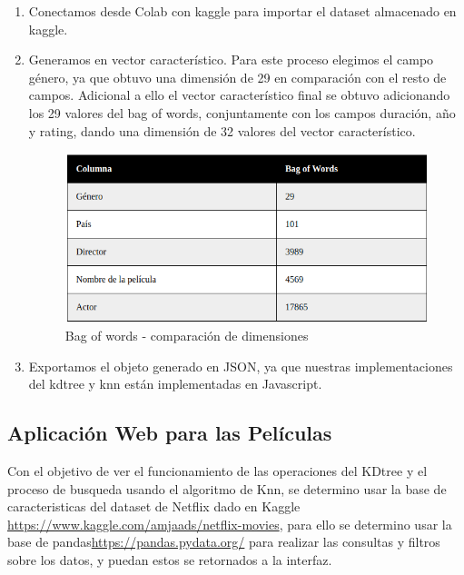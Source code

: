 \documentclass{article}
\begin{document}
    	\begin{enumerate}
    	        \item Conectamos desde Colab con kaggle para importar el dataset almacenado en kaggle.
    	        \item Generamos en vector característico.
    	   Para este proceso elegimos el campo género, ya que obtuvo una dimensión de 29 en comparación con el resto de campos. Adicional a ello el vector característico final se obtuvo adicionando los 29 valores del bag of words, conjuntamente con los campos duración, año y rating, dando una dimensión de 32 valores del vector característico.
	            \begin{figure}[H]
    			\centering
    			\includegraphics[scale=0.45]{img/bagofwordscomparing.png}
    			\caption{Bag of words - comparación de dimensiones}
    			\label{fig:table}
    		\end{figure}

    	         \item Exportamos el objeto generado en JSON, ya que nuestras implementaciones del kdtree y knn están implementadas en Javascript.
            	   
    	    \end{enumerate}
    	    
     
    	
    	\subsection{Aplicación Web para las Películas}
    	    Con el objetivo de ver el funcionamiento de las operaciones del KDtree y el proceso de busqueda usando el algoritmo de Knn, se determino usar la base de caracteristicas del dataset de Netflix dado en Kaggle \url{https://www.kaggle.com/amjaads/netflix-movies}, para ello se determino usar la base de pandas\url{https://pandas.pydata.org/} para realizar las consultas y filtros sobre los datos, y puedan estos se retornados a la interfaz.
    	    
\end{document}

